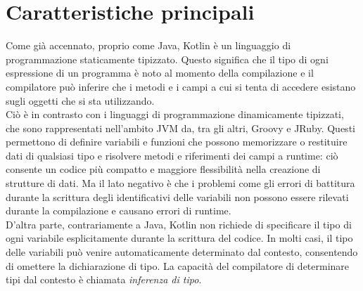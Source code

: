 \section{Caratteristiche principali}
Come già accennato, proprio come Java, Kotlin è un linguaggio di programmazione staticamente tipizzato.
Questo significa che il tipo di ogni espressione di un programma è noto al momento della compilazione
e il compilatore può inferire che i metodi e i campi a cui si tenta di accedere esistano sugli oggetti
che si sta utilizzando. \\
Ciò è in contrasto con i linguaggi di programmazione dinamicamente tipizzati, che sono
rappresentati nell’ambito JVM da, tra gli altri, Groovy e JRuby. Questi permettono di
definire variabili e funzioni che possono memorizzare o restituire dati di qualsiasi tipo e risolvere metodi
e riferimenti dei campi a runtime: ciò consente un codice più compatto e maggiore
flessibilità nella creazione di strutture di dati. Ma il lato negativo è che i problemi come gli errori
di battitura durante la scrittura degli identificativi delle variabili non possono essere rilevati durante
la compilazione e causano errori di runtime. \\
D'altra parte, contrariamente a Java, Kotlin non richiede di specificare il tipo di ogni variabile
esplicitamente durante la scrittura del codice. In molti casi, il tipo delle variabili può venire
automaticamente determinato dal contesto, consentendo di omettere la dichiarazione di tipo.
La capacità del compilatore di determinare tipi dal contesto è chiamata {\em inferenza di tipo}. \\

